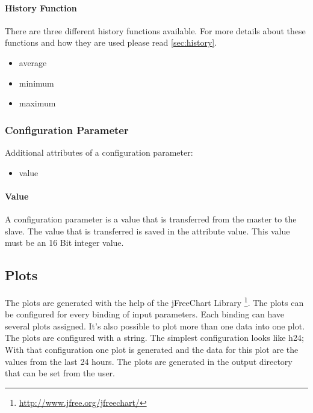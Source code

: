 \paragraph{History Function} %
\label{par:histfunc}
There are three different history functions available. For more details about these functions and how they are used please read \ref{sec:history}.
\label{par:history_function}
\begin{itemize}
    \item average
    \item minimum
    \item maximum
\end{itemize}

\subsubsection{Configuration Parameter} %
\label{ssub:configuration_parameter}
Additional attributes of a configuration parameter:
\begin{itemize}
    \item value
\end{itemize}

\paragraph{Value} %
\label{par:value}
A configuration parameter is a value that is transferred from the master to the slave. The value that is transferred is saved in the attribute value. This value must be an 16 Bit integer value.


\subsection{Plots} %
\label{sub:plots}
The plots are generated with the help of the jFreeChart Library \footnote{\url{http://www.jfree.org/jfreechart/}}.
The plots can be configured for every binding of input parameters. Each binding can have several plots assigned. It's also possible to plot more than one data into one plot. The plots are configured with a string. The simplest configuration looks like {\C h24;} With that configuration one plot is generated and the data for this plot are the values from the last 24 hours. The plots are generated in the output directory that can be set from the user.

